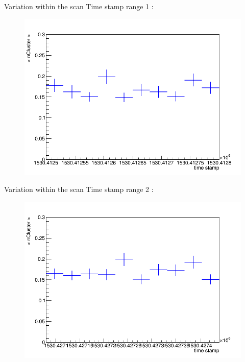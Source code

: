 \documentclass{beamer}
\begin{document}
	\begin{frame}
		\begin{block}{Variation within the scan}
			Time stamp range 1 :
			\begin{figure}[H!]
				\begin{center}
					\includegraphics[scale=0.25]{timeStampAverageCluster(1530412500<timeStamp<1530412800).png}
				\end{center}
			\end{figure}
		\end{block}
	\end{frame}

	\begin{frame}
		\begin{block}{Variation within the scan}
			Time stamp range 2 :
			\begin{figure}[H!]
				\begin{center}
					\includegraphics[scale=0.25]{timeStampAverageCluster(1530427080<timeStamp<1530427440).png}
				\end{center}
			\end{figure}
		\end{block}
	\end{frame}
	
\end{document}
